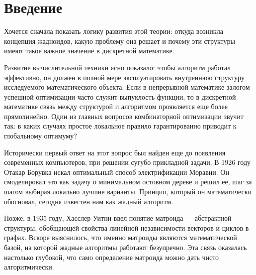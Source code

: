 
\usepackage[most]{tcolorbox}


\section{Введение}
Хочется сначала показать логику развития этой теории: откуда возникла концепция жадноидов, какую проблему она решает и почему эти структуры имеют такое важное значение в дискретной математике. 

Развитие вычислительной техники ясно показало: чтобы алгоритм работал эффективно, он должен в полной мере эксплуатировать внутреннюю структуру исследуемого математического объекта. Если в непрерывной математике залогом успешной оптимизации часто служит выпуклость функции, то в дискретной математике связь между структурой и алгоритмом проявляется еще более прямолинейно. Один из главных вопросов комбинаторной оптимизации звучит так: в каких случаях простое локальное правило гарантированно приводит к глобальному оптимуму? 

Исторически первый ответ на этот вопрос был найден еще до появления современных компьютеров, при решении сугубо прикладной задачи. В 1926 году Отакар Борувка искал оптимальный способ электрификации Моравии. Он смоделировал это как задачу о минимальном остовном дереве и решил ее, шаг за шагом выбирая локально лучшие варианты. Принцип, который он математически обосновал, сегодня известен нам как жадный алгоритм. 

Позже, в 1935 году, Хасслер Уитни ввел понятие матроида — абстрактной структуры, обобщающей свойства линейной независимости векторов и циклов в графах. Вскоре выяснилось, что именно матроиды являются математической базой, на которой жадные алгоритмы работают безупречно. Эта связь оказалась настолько глубокой, что само определение матроида можно дать чисто алгоритмически.

